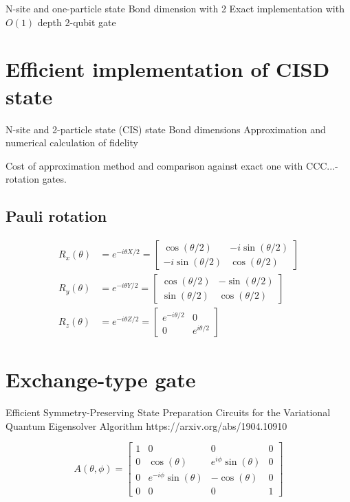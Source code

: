 \documentclass[11pt, oneside]{article}   	%
\begin{document}
N-site and one-particle state
Bond dimension with 2
Exact implementation with $O(1)$ depth 2-qubit gate



\section{Efficient implementation of CISD state}
N-site and 2-particle state (CIS) state
Bond dimensions 
Approximation and numerical calculation of fidelity

Cost of approximation method and comparison against exact one with CCC...-rotation gates.




\subsection{Pauli rotation}
\begin{align}
R_x(\theta) &= e^{-i \theta X/2} = 
\begin{bmatrix}
\cos(\theta/2) & -i \sin(\theta/2) \\
-i \sin(\theta/2) & \cos(\theta/2)
\end{bmatrix} \\
R_y(\theta) &= e^{-i \theta Y/2} = 
\begin{bmatrix}
\cos(\theta/2) & -\sin(\theta/2) \\
\sin(\theta/2) & \cos(\theta/2)
\end{bmatrix} \\
R_z(\theta) &= e^{-i \theta Z/2} = 
\begin{bmatrix}
e^{-i \theta/2} & 0 \\
0 & e^{i \theta/2}
\end{bmatrix}
\end{align}

\section{Exchange-type gate}
Efficient Symmetry-Preserving State Preparation Circuits for the Variational Quantum Eigensolver Algorithm
https://arxiv.org/abs/1904.10910

\begin{equation}
A(\theta, \phi) = 
\begin{bmatrix}
1 & 0 & 0 & 0 \\
0 & \cos(\theta) & e^{i \phi} \sin(\theta) & 0 \\
0 & e^{-i \phi} \sin(\theta) & -\cos(\theta) & 0 \\
0 & 0 & 0 & 1
\end{bmatrix}
\end{equation}
\end{document}
